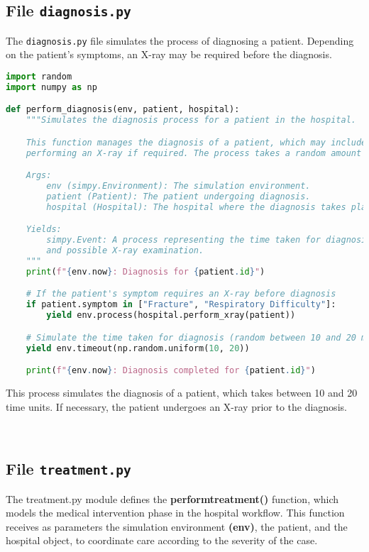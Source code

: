 \documentclass[a4paper,12pt]{article}
\begin{document}
\subsection{File \texttt{diagnosis.py}}

The \texttt{diagnosis.py} file simulates the process of diagnosing a patient. Depending on the patient's symptoms, an X-ray may be required before the diagnosis.
\begin{lstlisting}[language=Python]
import random
import numpy as np

def perform_diagnosis(env, patient, hospital):
    """Simulates the diagnosis process for a patient in the hospital.

    This function manages the diagnosis of a patient, which may include 
    performing an X-ray if required. The process takes a random amount of time.

    Args:
        env (simpy.Environment): The simulation environment.
        patient (Patient): The patient undergoing diagnosis.
        hospital (Hospital): The hospital where the diagnosis takes place.

    Yields:
        simpy.Event: A process representing the time taken for diagnosis 
        and possible X-ray examination.
    """
    print(f"{env.now}: Diagnosis for {patient.id}")

    # If the patient's symptom requires an X-ray before diagnosis
    if patient.symptom in ["Fracture", "Respiratory Difficulty"]:
        yield env.process(hospital.perform_xray(patient))  

    # Simulate the time taken for diagnosis (random between 10 and 20 minutes)
    yield env.timeout(np.random.uniform(10, 20))

    print(f"{env.now}: Diagnosis completed for {patient.id}")

\end{lstlisting}
This process simulates the diagnosis of a patient, which takes between 10 and 20 time units. If necessary, the patient undergoes an X-ray prior to the diagnosis.

\\


\subsection{File \texttt{treatment.py}}
The treatment.py module defines the \textbf{performtreatment()} function, which models the medical intervention phase in the hospital workflow. This function receives as parameters the simulation environment \textbf{(env)}, the patient, and the hospital object, to coordinate care according to the severity of the case.
\end{document}

